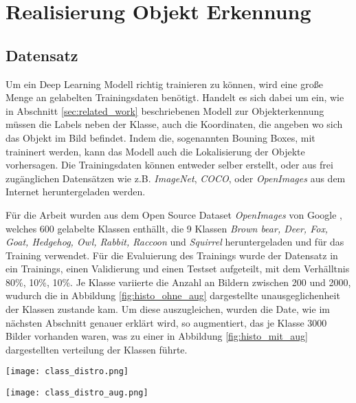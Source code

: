 \chapter{Realisierung Objekt Erkennung}\label{kap:object_det}

\section{Datensatz}\label{sec:dataset}

Um ein Deep Learning Modell richtig trainieren zu können, 
wird eine große Menge an gelabelten Trainingsdaten benötigt.
Handelt es sich dabei um ein, wie in Abschnitt
\ref{sec:related_work} beschriebenen  Modell zur Objekterkennung
müssen die Labels neben der Klasse, auch die Koordinaten, 
die angeben wo sich das Objekt im Bild befindet. 
Indem die, sogenannten Bouning Boxes, mit traininert werden, 
kann das Modell auch die Lokalisierung der Objekte vorhersagen.
Die Trainingsdaten können entweder selber erstellt, oder 
aus frei zugänglichen Datensätzen wie z.B. \textit{ImageNet}, 
\textit{COCO}, oder \textit{OpenImages}
aus dem Internet heruntergeladen werden.

Für die Arbeit wurden aus dem Open Source Dataset
\textit{OpenImages} von Google
\cite{kuznetsovaOpenImagesDataset2018}, 
welches 600 gelabelte Klassen enthällt, 
die 9 Klassen \textit{Brown bear, Deer, Fox, Goat, 
Hedgehog, Owl, Rabbit, Raccoon} und \textit{Squirrel}
heruntergeladen und für das Training verwendet.
Für die Evaluierung des Trainings wurde der 
Datensatz in ein Trainings, einen Validierung und einen 
Testset aufgeteilt, mit dem Verhälltnis 80\%, 10\%, 10\%.
Je Klasse variierte die Anzahl an Bildern zwischen 200 und 
2000, wudurch die in Abbildung \ref{fig:histo_ohne_aug}
dargestellte unausgeglichenheit der Klassen zustande kam.
Um diese auszugleichen, wurden die Date, wie im nächsten Abschnitt 
genauer erklärt wird, so augmentiert, das je Klasse 3000 Bilder 
vorhanden waren, was zu einer in Abbildung \ref{fig:histo_mit_aug}
dargestellten verteilung der Klassen führte.

\vspace{1cm}
\begin{minipage}{0.5\textwidth}
    \centering
    \texttt{[image: class\_distro.png]}
    \label{fig:histo_ohne_aug}
\end{minipage}
\begin{minipage}{0.5\textwidth}
    \centering
    \texttt{[image: class\_distro\_aug.png]}
    \label{fig:histo_mit_aug}
\end{minipage}
\vspace{1cm}

